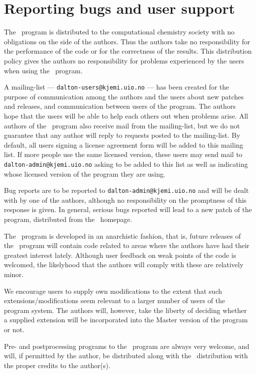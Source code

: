\section{Reporting bugs and user support}

The \siraba\ program is distributed to the computational chemistry
society with no obligations on the side of the
authors. Thus the authors take no responsibility
for the performance 
of the code or for the correctness of the
results. This distribution 
policy gives the authors no responsibility for problems experienced by
the users when using the \siraba\ program.

A mailing-list ---
\verb|dalton-users@kjemi.uio.no| --- has been created for 
the purpose of communication among the authors and the users about
new patches and releases, and communication between users of the
program. The authors hope that the 
users will be able to help each others out when problems
arise. All authors of the \siraba\ program also receive mail from the
mailing-list, but we do not guarantee that any author will reply to
requests posted to the mailing-list. By default, all users signing a
license agreement form will be added to this mailing list. If more
people use the same licensed version, these users may send mail to
\verb|dalton-admin@kjemi.uio.no| asking to be added to this list as
well as indicating whose licensed version of the program they are using.

Bug reports are to be reported to \verb|dalton-admin@kjemi.uio.no| and
will be dealt with by one of the authors, although no responsibility
on the promptness of this response is given. In general, serious bugs
reported will lead to a new patch of the program, distributed from the
\siraba\ homepage.

The \siraba\ program is developed in an anarchistic fashion, that is,
future releases of the \siraba\ program will contain code related to
areas where the authors have had their greatest interest
lately. Although user feedback on weak points of the code is welcomed, the
likelyhood that the authors will comply with these are relatively
minor.

We encourage users to supply own modifications to
the extent that 
such extensions/modifications seem relevant to a larger number of
users of the program system. The authors will, however, take the
liberty of deciding whether a supplied extension will be incorporated
into the Master version of the program or not.

Pre- and postprocessing programs to the \siraba\ program are always
very welcome, and will, if permitted by the author, be distributed along
with the \siraba\ distribution with the proper credits to the
author(s).
